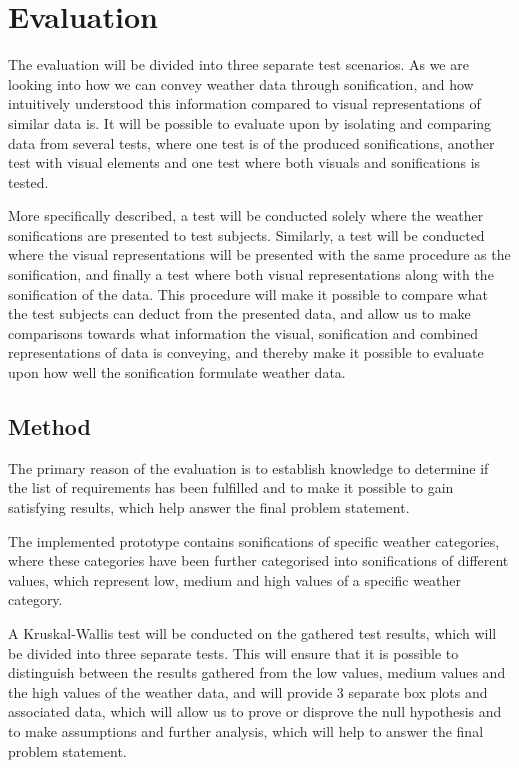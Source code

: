 
\section{Evaluation} %
\label{sec:evaluation}

The evaluation will be divided into three separate test scenarios. 
As we are looking into how we can convey weather data through sonification, and how intuitively understood this information compared to visual representations of similar data is. 
It will be possible to evaluate upon by isolating and comparing data from several tests, where one test is of the produced sonifications, another test with visual elements and one test where both visuals and sonifications is tested.

More specifically described, a test will be conducted solely where the weather sonifications are presented to test subjects. 
Similarly, a test will be conducted where the visual representations will be presented with the same procedure as the sonification, and finally a test where both visual representations along with the sonification of the data.
This procedure will make it possible to compare what the test subjects can deduct from the presented data, and allow us to make comparisons towards what information the visual, sonification and combined representations of data is conveying, and thereby make it possible to evaluate upon how well the sonification formulate weather data.


\subsection{Method} %
\label{sub:method}

The primary reason of the evaluation is to establish knowledge to determine if the list of requirements has been fulfilled and to make it possible to gain satisfying results, which help answer the final problem statement.

The implemented prototype contains sonifications of specific weather categories, where these categories have been further categorised into sonifications of different values, which represent low, medium and high values of a specific weather category.

A Kruskal-Wallis test will be conducted on the gathered test results, which will be divided into three separate tests. 
This will ensure that it is possible to distinguish between the results gathered from the low values, medium values and the high values of the weather data, and will provide 3 separate box plots and associated data, which will allow us to prove or disprove the null hypothesis and to make assumptions and further analysis, which will help to answer the final problem statement.


